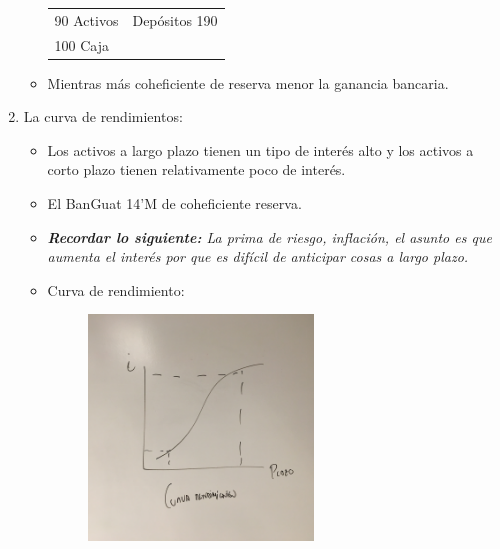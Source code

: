 \begin{enumerate}
\begin{itemize}
            \begin{center}
            \begin{tabular}{ | p{7cm} | p{7cm} | }
                \hline
                     90 Activos & Depósitos 190 \\
                     100 Caja &  \\  
                \hline
            \end{tabular}
        \end{center}

            
            \item Mientras más coheficiente de reserva menor la ganancia bancaria.
        \end{itemize}
    
    \item La curva de rendimientos:
        \begin{itemize}
            \item Los activos a largo plazo tienen un tipo de interés alto y los activos a corto plazo tienen relativamente poco de interés.
            \item El BanGuat 14'M de coheficiente reserva.
            \item \emph{\textbf{Recordar lo siguiente: }La prima de riesgo, inflación, el asunto es que aumenta el interés por que es difícil de anticipar cosas a largo plazo. }
            \item Curva de rendimiento: 
            \begin{center}
            \begin{figure}[htbp]
                \centering
                \includegraphics[width=6cm]{Classes/Images/2019-11-04-01.JPG}  
                \caption{}
                \label{}
            \end{figure}              
            \end{center}
        \end{itemize}
    

\end{enumerate}
